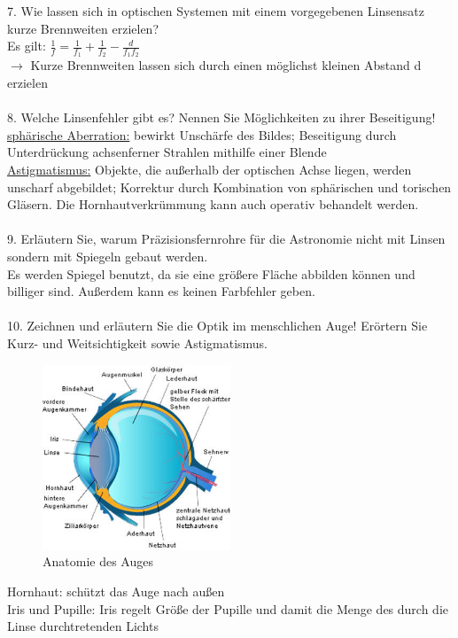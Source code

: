 7. Wie lassen sich in optischen Systemen mit einem vorgegebenen Linsensatz kurze Brennweiten
erzielen?\\
Es gilt: $\frac{1}{f}=\frac{1}{f_1}+\frac{1}{f_2}-\frac{d}{f_1f_2}$\\
$\rightarrow$ Kurze Brennweiten lassen sich durch einen möglichst kleinen Abstand d erzielen\\
\\8. Welche Linsenfehler gibt es? Nennen Sie Möglichkeiten zu ihrer Beseitigung!\\
\underline{sphärische Aberration:} bewirkt Unschärfe des Bildes; Beseitigung durch Unterdrückung achsenferner Strahlen mithilfe einer Blende\\
\underline{Astigmatismus:} Objekte, die außerhalb der optischen Achse liegen, werden unscharf abgebildet; Korrektur durch Kombination von sphärischen und torischen Gläsern. Die Hornhautverkrümmung kann auch operativ behandelt werden.\\
\\9. Erläutern Sie, warum Präzisionsfernrohre für die Astronomie nicht mit Linsen sondern mit
Spiegeln gebaut werden.\\
Es werden Spiegel benutzt, da sie eine größere Fläche abbilden können und billiger sind. Außerdem kann es keinen Farbfehler geben.\\\\
10. Zeichnen und erläutern Sie die Optik im menschlichen Auge! Erörtern Sie Kurz- und Weitsichtigkeit sowie Astigmatismus.\\
\begin{figure}[h]
 \includegraphics[width=0.5\textwidth]{Auge}
 \caption{Anatomie des Auges}
\end{figure}
Hornhaut: schützt das Auge nach außen\\
Iris und Pupille: Iris regelt Größe der Pupille und damit die Menge des durch die Linse durchtretenden Lichts\\
